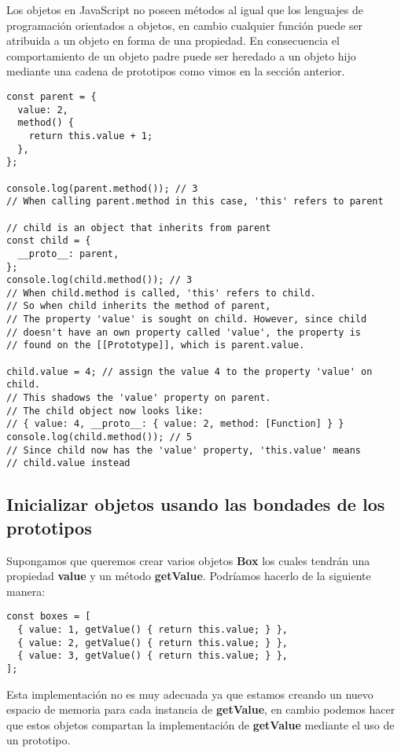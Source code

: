 \documentclass{article}
\begin{document}
Los objetos en JavaScript no poseen métodos al igual que los lenguajes de programación orientados  a objetos,
en cambio cualquier función puede ser atribuida a un objeto en forma de una propiedad. En consecuencia el
comportamiento de un objeto padre puede ser heredado a un objeto hijo mediante una cadena de prototipos como vimos
en la sección anterior.

\begin{lstlisting}
const parent = {
  value: 2,
  method() {
    return this.value + 1;
  },
};

console.log(parent.method()); // 3
// When calling parent.method in this case, 'this' refers to parent

// child is an object that inherits from parent
const child = {
  __proto__: parent,
};
console.log(child.method()); // 3
// When child.method is called, 'this' refers to child.
// So when child inherits the method of parent,
// The property 'value' is sought on child. However, since child
// doesn't have an own property called 'value', the property is
// found on the [[Prototype]], which is parent.value.

child.value = 4; // assign the value 4 to the property 'value' on child.
// This shadows the 'value' property on parent.
// The child object now looks like:
// { value: 4, __proto__: { value: 2, method: [Function] } }
console.log(child.method()); // 5
// Since child now has the 'value' property, 'this.value' means
// child.value instead

\end{lstlisting}

\subsection{Inicializar objetos usando las bondades de los prototipos}

Supongamos que queremos crear varios objetos \textbf{Box} los cuales tendrán una propiedad \textbf{value} y un método
\textbf{getValue}. Podríamos hacerlo de la siguiente manera:

\begin{lstlisting}
const boxes = [
  { value: 1, getValue() { return this.value; } },
  { value: 2, getValue() { return this.value; } },
  { value: 3, getValue() { return this.value; } },
];
\end{lstlisting}

Esta implementación no es muy adecuada ya que estamos creando un nuevo espacio de memoria para cada instancia
de \textbf{getValue}, en cambio podemos hacer que estos objetos compartan la implementación de \textbf{getValue}
mediante el uso de un prototipo.
\end{document}
